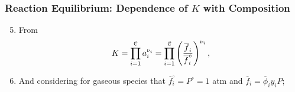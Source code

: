 \documentclass[10pt,compress,handout,unknownkeysallowed]{beamer}
\begin{document}
\begin{frame}
  \frametitle{Reaction Equilibrium:  Dependence of $K$ with Composition } 
      \begin{enumerate} \setcounter{enumi}{4} 
         \item<1-> From 
           \begin{displaymath}
                K = \prod\limits_{i=1}^{\mathcal{C}} a_{i}^{\nu_{i}} = \prod\limits_{i=1}^{\mathcal{C}} \left(\displaystyle\frac{\overline{f}_{i}}{\overline{f}_{i}^{\circ}}\right)^{\nu_{i}},
           \end{displaymath} 
         \item<2-> And considering for gaseous species that $\overline{f}_{i}^{\circ}=P^{\circ}=1$ atm and $\overline{f}_{i} = \overline{\phi}_{i}y_{i}P$;
      \end{enumerate}

\end{frame}
\end{document}
